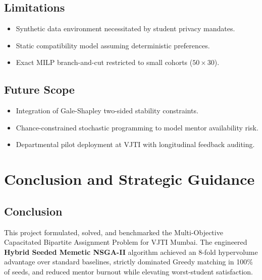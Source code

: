 \documentclass[11pt,a4paper,oneside]{report}
\begin{document}
\section{Limitations}
\begin{itemize}
    \item Synthetic data environment necessitated by student privacy mandates.
    \item Static compatibility model assuming deterministic preferences.
    \item Exact MILP branch-and-cut restricted to small cohorts ($50 \times 30$).
\end{itemize}

\section{Future Scope}
\begin{itemize}
    \item Integration of Gale-Shapley two-sided stability constraints.
    \item Chance-constrained stochastic programming to model mentor availability risk.
    \item Departmental pilot deployment at VJTI with longitudinal feedback auditing.
\end{itemize}

\chapter{Conclusion and Strategic Guidance}

\section{Conclusion}
This project formulated, solved, and benchmarked the Multi-Objective Capacitated Bipartite Assignment Problem for VJTI Mumbai. The engineered \textbf{Hybrid Seeded Memetic NSGA-II} algorithm achieved an 8-fold hypervolume advantage over standard baselines, strictly dominated Greedy matching in 100\% of seeds, and reduced mentor burnout while elevating worst-student satisfaction.
\end{document}
